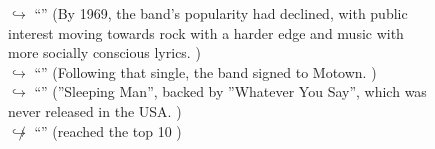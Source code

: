 \documentclass[11pt,a4paper, onecolumn]{article}
\begin{document}
\begin{figure}[t] \small \begin{tcolorbox}[boxsep=0pt,left=5pt,right=0pt,top=2pt,colback = yellow!5] \begin{dialogue}
 \small 
\colorbox{pink!25}{$\hookrightarrow$}
{ ``'' (By 1969, the band's popularity had declined, with public interest moving towards rock with a harder edge and music with more socially conscious lyrics. ) }
\\
\colorbox{pink!25}{$\hookrightarrow$}
{ ``'' (Following that single, the band signed to Motown. ) }
\\
\colorbox{pink!25}{$\hookrightarrow$}
{ ``'' (''Sleeping Man'', backed by ''Whatever You Say'', which was never released in the USA. ) }
\\
\colorbox{pink!25}{$\not\hookrightarrow$}
{ ``'' (reached the top 10 ) }
\\
 \end{dialogue}\end{tcolorbox}\end{figure}
\end{document}

